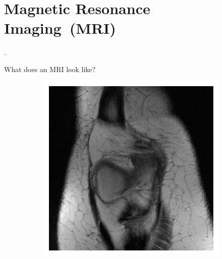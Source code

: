 \section{Magnetic Resonance Imaging~(MRI)}

\begin{frame}[plain,c]
    
    \begin{center}
        \color{DarkBlue}
    \Huge \thesection. \insertsection
    \end{center}
    
\end{frame}

\begin{frame}{What does an MRI look like?}
    \begin{figure}
        \centering
        \begin{subfigure}{0.45\textwidth}
            \includegraphics[height=0.6\textheight]{Figures/intro_figures/example_knee_fastmri.pdf}
        \end{subfigure}
        \begin{subfigure}{0.45\textwidth}

\end{subfigure}
\end{figure}
\end{frame}

